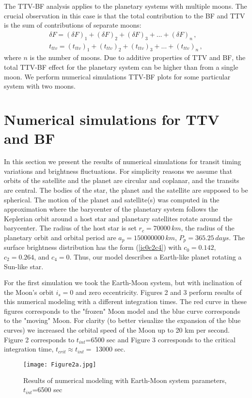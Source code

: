 \documentclass[12pt]{article}
\begin{document}
 
 The TTV-BF analysis applies to the planetary systems with multiple moons. The crucial observation in this case is that the total contribution to the BF and TTV is the sum of contributions of separate moons: 
\begin{equation}\label{dFdt}\begin{array}{l}\displaystyle
\delta F=(\delta F)_1+(\delta F)_2+(\delta F)_3+\ldots+(\delta F)_n\,,\\[3mm]
\displaystyle t_{{ttv}}=(t_{{ttv}})_1+(t_{{ttv}})_2+(t_{{ttv}})_3+\ldots+(t_{{ttv}})_n\,,
\end{array}\end{equation}
where $n$ is the number of moons. Due to additive properties of TTV and BF, the total TTV-BF effect for the planetary system can be higher than from a single moon. We perform numerical simulations TTV-BF plots for some particular system with two moons.  

\section{Numerical simulations for TTV and BF}

In this section we present the results of numerical simulations for transit timing variations and brightness fluctuations. For simplicity reasons we assume that orbits of the satellite and the planet are circular and coplanar, and the transits are central. The bodies of the star, the planet and the satellite are supposed to be spherical. The motion of the planet and satellite(s) was computed in the approximation where the barycenter of the planetary system follows the Keplerian orbit around a host star and planetary satellites rotate around the barycenter. The radius of the host star is set $r_c=70000\,{km}$, the radius of the planetary orbit and orbital period are $a_p=150000000\,{km}$, $P_p=365.25\,{days}$. The surface brightness distribution has the form (\ref{ic0c2c4}) with $c_0=0.142$, $c_2=0.264$, and $c_4=0$. Thus, our model describes a Earth-like planet rotating a Sun-like star.

For the first simulation we took the Earth-Moon system, but with inclination of the Moon's orbit $i_s=0$ and zero eccentricity. Figures 2 and 3 perform results of this numerical modeling with a different integration times. The red curve in these figures corresponds to the "frozen" Moon model and the blue curve corresponds to the "moving" Moon. For clarity (to better visualize the expansion of the blue curves) we increased the orbital speed of the Moon up to 20 km per second. Figure 2 corresponds to $t_{int}$=6500 sec and Figure 3 corresponds to the critical integration time, $t_{crit} \approx t_{int} =$ 13000 sec. 
\begin{figure}[h]
\centering
\texttt{[image: Figure2a.jpg]}
\caption{Results of numerical modeling with Earth-Moon system parameters, $t_{int}$=6500 sec}
\centering
\label{fig:2a}
\end{figure}
\end{document}
